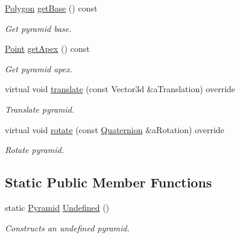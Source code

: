 \begin{DoxyCompactItemize}
\hyperlink{classlibrary_1_1math_1_1geom_1_1d3_1_1objects_1_1_polygon}{Polygon} \hyperlink{classlibrary_1_1math_1_1geom_1_1d3_1_1objects_1_1_pyramid_a247e3c188d7919b2043e59d46b67c2ef}{get\+Base} () const
\begin{DoxyCompactList}\small\item\em Get pyramid base. \end{DoxyCompactList}\item 
\hyperlink{classlibrary_1_1math_1_1geom_1_1d3_1_1objects_1_1_point}{Point} \hyperlink{classlibrary_1_1math_1_1geom_1_1d3_1_1objects_1_1_pyramid_af24d52592c3154d633f694411d11396c}{get\+Apex} () const
\begin{DoxyCompactList}\small\item\em Get pyramid apex. \end{DoxyCompactList}\item 
virtual void \hyperlink{classlibrary_1_1math_1_1geom_1_1d3_1_1objects_1_1_pyramid_a8a8514a9db12bea021014ce38a6db3b5}{translate} (const Vector3d \&a\+Translation) override
\begin{DoxyCompactList}\small\item\em Translate pyramid. \end{DoxyCompactList}\item 
virtual void \hyperlink{classlibrary_1_1math_1_1geom_1_1d3_1_1objects_1_1_pyramid_a06b022532e8477f4c4197e497113af99}{rotate} (const \hyperlink{classlibrary_1_1math_1_1geom_1_1trf_1_1rot_1_1_quaternion}{Quaternion} \&a\+Rotation) override
\begin{DoxyCompactList}\small\item\em Rotate pyramid. \end{DoxyCompactList}\end{DoxyCompactItemize}
\subsection*{Static Public Member Functions}
\begin{DoxyCompactItemize}
\item 
static \hyperlink{classlibrary_1_1math_1_1geom_1_1d3_1_1objects_1_1_pyramid}{Pyramid} \hyperlink{classlibrary_1_1math_1_1geom_1_1d3_1_1objects_1_1_pyramid_a254e7635e0c9f75da8502f98207e6dfe}{Undefined} ()
\begin{DoxyCompactList}\small\item\em Constructs an undefined pyramid. \end{DoxyCompactList}\end{DoxyCompactItemize}

